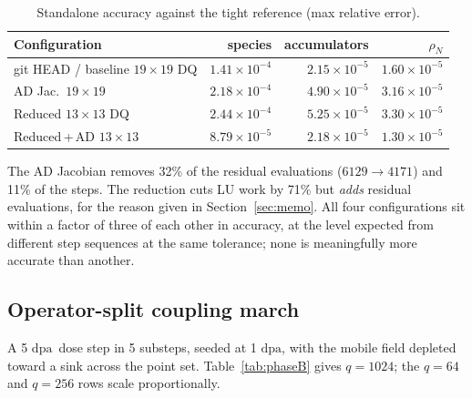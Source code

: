 \documentclass[11pt,a4paper]{article}
\newcommand{\dpa}{\ensuremath{\mathrm{dpa}}}
\begin{document}
\begin{table}[htb]
\centering
\caption{Standalone accuracy against the tight reference (max relative error).}
\label{tab:phaseAerr}
\begin{tabular}{lrrr}
\toprule
Configuration & species & accumulators & $\rho_N$ \\
\midrule
git HEAD / baseline $19\times19$ DQ & $1.41\times10^{-4}$ & $2.15\times10^{-5}$ & $1.60\times10^{-5}$ \\
AD Jac.\ $19\times19$               & $2.18\times10^{-4}$ & $4.90\times10^{-5}$ & $3.16\times10^{-5}$ \\
Reduced $13\times13$ DQ             & $2.44\times10^{-4}$ & $5.25\times10^{-5}$ & $3.30\times10^{-5}$ \\
Reduced\,+\,AD $13\times13$         & $8.79\times10^{-5}$ & $2.18\times10^{-5}$ & $1.30\times10^{-5}$ \\
\bottomrule
\end{tabular}
\end{table}

The AD Jacobian removes 32\% of the residual evaluations
($6129\to4171$) and 11\% of the steps. The reduction cuts LU work by 71\% but
\emph{adds} residual evaluations, for the reason given in
Section~\ref{sec:memo}. All four configurations sit within a factor of three of
each other in accuracy, at the level expected from different step sequences at
the same tolerance; none is meaningfully more accurate than another.

\subsection{Operator-split coupling march}

A 5 \dpa\ dose step in 5 substeps, seeded at 1 \dpa, with the mobile field
depleted toward a sink across the point set. Table~\ref{tab:phaseB} gives
$q=1024$; the $q=64$ and $q=256$ rows scale proportionally.
\end{document}
